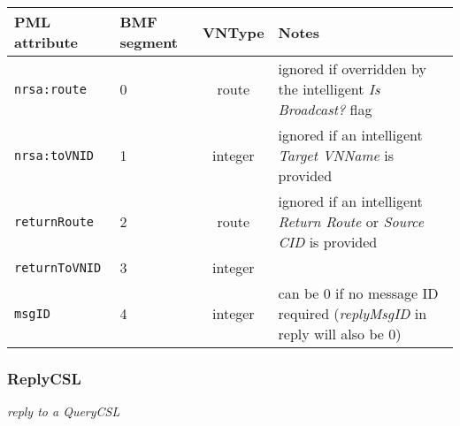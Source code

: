 \documentclass[pdftex,a4paper]{article}
\newcommand{\XMLfont}[1]{{\tt \small #1}}
\begin{document}
\begin{table}[!h]
  \begin{center}
    \label{tab:QueryCSL}
    \begin{tabular}{|l|p{13mm}|c|p{60mm}|}
      \hline

      \textbf{PML attribute} & \textbf{BMF segment} & \textbf{VNType}
      & \textbf{Notes} \\\hline

      \XMLfont{nrsa:route} & 0 & route & ignored if overridden by the
      intelligent {\em Is Broadcast?} flag \\\hline

      \XMLfont{nrsa:toVNID} & 1 & integer & ignored if an intelligent {\em
      Target VNName} is provided \\\hline

      \XMLfont{returnRoute} & 2 & route & ignored if an
      intelligent {\em Return Route} or {\em Source CID} is provided
      \\\hline

      \XMLfont{returnToVNID} & 3 & integer & \\\hline

      \XMLfont{msgID} & 4 & integer & can be 0 if no message ID
      required ({\em replyMsgID} in reply will also be 0) \\\hline

    \end{tabular}
  \end{center}
\end{table}

\subsubsection{ReplyCSL}
{\em reply to a QueryCSL}
\end{document}
